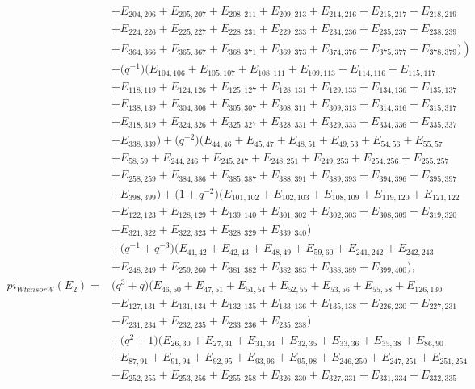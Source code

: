 \documentclass[10pt,a4paper]{amsart}
\numberwithin{equation}{section}
\theoremstyle{definition}
\def\pi{pi}
\def\otimes{ tensor }
\begin{document}
\begin{align*}
 &+E_{204,206}+E_{205,207}+E_{208,211}+E_{209,213}+E_{214,216}+E_{215,217}+E_{218,219} \\
 &+E_{224,226}+E_{225,227}+E_{228,231}+E_{229,233}+E_{234,236}+E_{235,237}+E_{238,239} \\
 &\left.+E_{364,366}+E_{365,367}+E_{368,371}+E_{369,373}+E_{374,376}+E_{375,377}+E_{378,379})\right) \\
 &+\bigl(q^{-1}\bigr)(E_{104,106}+E_{105,107}+E_{108,111}+E_{109,113}+E_{114,116}+E_{115,117} \\
 &+E_{118,119}+E_{124,126}+E_{125,127}+E_{128,131}+E_{129,133}+E_{134,136}+E_{135,137}\\
 &+E_{138,139} +E_{304,306}+E_{305,307}+E_{308,311}+E_{309,313}+E_{314,316}+E_{315,317} \\
 &+E_{318,319}+E_{324,326}+E_{325,327}+E_{328,331}+E_{329,333}+E_{334,336}+E_{335,337} \\
 &+E_{338,339})+\bigl(q^{-2}\bigr)(E_{44,46}+E_{45,47}+E_{48,51}+E_{49,53}+E_{54,56}+E_{55,57} \\
 &+E_{58,59}+E_{244,246}+E_{245,247}+E_{248,251}+E_{249,253}+E_{254,256}+E_{255,257} \\
 &+E_{258,259}+E_{384,386}+E_{385,387}+E_{388,391}+E_{389,393}+E_{394,396}+E_{395,397} \\
 &+E_{398,399})+\bigl(1+q^{-2}\bigr)(E_{101,102}+E_{102,103}+E_{108,109}+E_{119,120}+E_{121,122} \\
 &+E_{122,123}+E_{128,129}+E_{139,140}+E_{301,302}+E_{302,303}+E_{308,309}+E_{319,320} \\
 &+E_{321,322}+E_{322,323}+E_{328,329}+E_{339,340}) \\
 &+\bigl(q^{-1}+q^{-3}\bigr)(E_{41,42}+E_{42,43}+E_{48,49}+E_{59,60}+E_{241,242}+E_{242,243} \\
 &+E_{248,249}+E_{259,260}+E_{381,382}+E_{382,383}+E_{388,389}+E_{399,400}),
\\
 \pi_{W \otimes W}(E_2) ={}&
\bigl(q^3 + q\bigr)(E_{46,50}+E_{47,51}+E_{51,54}+E_{52,55}+E_{53,56}+E_{55,58}+E_{126,130}\\
&+E_{127,131}+E_{131,134}+E_{132,135}+E_{133,136}+E_{135,138}+E_{226,230}+E_{227,231}\\
&+E_{231,234}+E_{232,235}+E_{233,236}+E_{235,238})\\
&+\bigl(q^2 + 1\bigr)(E_{26,30}+E_{27,31}+E_{31,34}+E_{32,35}+E_{33,36}+E_{35,38}+E_{86,90}\\
&+E_{87,91}+E_{91,94}+E_{92,95}+E_{93,96}+E_{95,98}+E_{246,250}+E_{247,251}+E_{251,254}\\
&+E_{252,255}+E_{253,256}+E_{255,258}+E_{326,330}+E_{327,331}+E_{331,334}+E_{332,335}\\

\end{align*}
\end{document}
